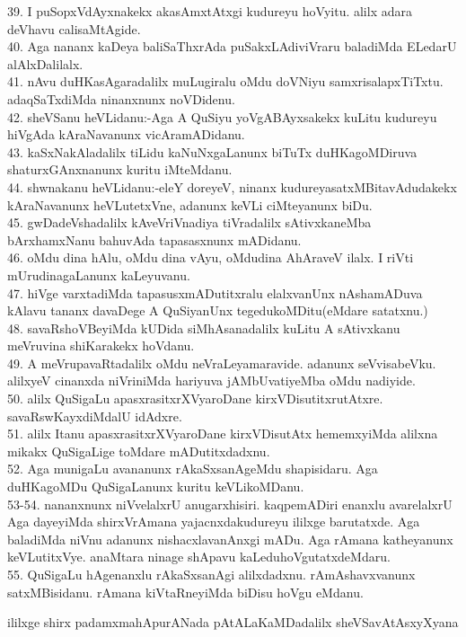 \documentclass{article}
\begin{document}
39. I puSopxVdAyxnakekx akasAmxtAtxgi kudureyu hoVyitu. alilx adara deVhavu calisaMtAgide.\\
40. Aga nananx kaDeya baliSaThxrAda puSakxLAdiviVraru baladiMda ELedarU alAlxDalilalx.\\
41. nAvu duHKasAgaradalilx muLugiralu oMdu doVNiyu samxrisalapxTiTxtu. adaqSaTxdiMda ninanxnunx noVDidenu.\\
42. sheVSanu heVLidanu:-Aga A QuSiyu yoVgABAyxsakekx kuLitu kudureyu hiVgAda kAraNavanunx vicAramADidanu.\\
43. kaSxNakAladalilx tiLidu kaNuNxgaLanunx biTuTx duHKagoMDiruva shaturxGAnxnanunx kuritu iMteMdanu.\\
44. shwnakanu heVLidanu:-eleY doreyeV, ninanx kudureyasatxMBitavAdudakekx kAraNavanunx heVLutetxVne, adanunx keVLi ciMteyanunx biDu.\\
45. gwDadeVshadalilx kAveVriVnadiya tiVradalilx sAtivxkaneMba bArxhamxNanu bahuvAda tapasasxnunx mADidanu.\\
46. oMdu dina hAlu, oMdu dina vAyu, oMdudina AhAraveV ilalx. I riVti mUrudinagaLanunx kaLeyuvanu.\\
47. hiVge varxtadiMda tapasusxmADutitxralu elalxvanUnx nAshamADuva kAlavu tananx davaDege A QuSiyanUnx tegedukoMDitu(eMdare satatxnu.)\\
48. savaRshoVBeyiMda kUDida siMhAsanadalilx kuLitu A sAtivxkanu meVruvina shiKarakekx hoVdanu.\\
49. A meVrupavaRtadalilx oMdu neVraLeyamaravide. adanunx seVvisabeVku. alilxyeV cinanxda niVriniMda hariyuva jAMbUvatiyeMba oMdu nadiyide.\\
50. alilx QuSigaLu apasxrasitxrXVyaroDane kirxVDisutitxrutAtxre. savaRswKayxdiMdalU idAdxre.\\
51. alilx Itanu apasxrasitxrXVyaroDane kirxVDisutAtx hememxyiMda alilxna mikakx QuSigaLige toMdare mADutitxdadxnu.\\
52. Aga munigaLu avananunx rAkaSxsanAgeMdu shapisidaru. Aga duHKagoMDu QuSigaLanunx kuritu keVLikoMDanu.\\
53-54. nananxnunx niVvelalxrU anugarxhisiri. kaqpemADiri enanxlu avarelalxrU Aga dayeyiMda shirxVrAmana yajacnxdakudureyu ililxge barutatxde. Aga baladiMda niVnu adanunx nishacxlavanAnxgi mADu. Aga rAmana katheyanunx keVLutitxVye. anaMtara ninage shApavu kaLeduhoVgutatxdeMdaru.\\
55. QuSigaLu hAgenanxlu rAkaSxsanAgi alilxdadxnu. rAmAshavxvanunx satxMBisidanu. rAmana kiVtaRneyiMda biDisu hoVgu eMdanu.

\begin{center}
ililxge shirx padamxmahApurANada pAtALaKaMDadalilx sheVSavAtAsxyXyana
\end{center}
\end{document}
